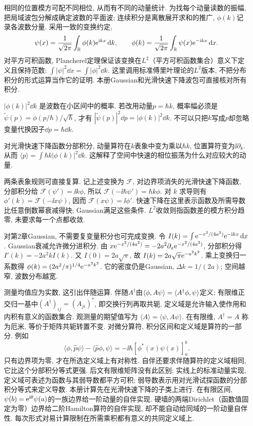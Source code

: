 相同的位置模方可配不同相位, 从而有不同的动量统计. 为找每个动量读数的振幅, 把局域波包分解成确定波数的平面波; 连续积分是离散展开求和的推广, $\phi(k)$记录各波数分量. 采用一致的变换约定,
\[
\psi(x)=\frac1{\sqrt{2\pi}}\int_\mathbb R\phi(k)\mathrm e^{\mathrm i kx}\,\mathrm d k,
\qquad
\phi(k)=\frac1{\sqrt{2\pi}}\int_\mathbb R\psi(x)\mathrm e^{-\mathrm i kx}\,\mathrm d x.
\]
对平方可积函数, Plancherel定理保证该变换在$L^2$（平方可积函数集合）意义下定义且保持范数: $\int|\psi|^2\dd x=\int|\phi|^2\dd k$. 这里调用标准傅里叶理论的$L^2$版本, 不把分布积分的形式运算当作它的证明. 本册Gaussian和光滑快速下降波包可直接核对所有积分.

$|\phi(k)|^2\dd k$ 是波数在小区间中的概率. 若改用动量$p=\hbar k$, 概率幅必须是 $\widetilde\psi(p)=\phi(p/\hbar)/\sqrt\hbar$, 才有 $|\widetilde\psi(p)|^2\dd p=|\phi(k)|^2\dd k$. 不可以只把$k$写成$p$却忽略变量代换因子$\dd p=\hbar\dd k$.

对光滑快速下降函数分部积分, 动量算符在$k$表象中变为乘以$\hbar k$, 位置算符变为$\ii\partial_k$. 从而 $\langle p\rangle=\int\hbar k|\phi(k)|^2\dd k$. 这解释了空间中快速的相位振荡为什么对应较大的动量.

两条表象规则可直接复算. 记上述变换为 $\mathcal F$, 对边界项消失的光滑快速下降函数, 分部积分给
$\mathcal F(\psi')=\ii k\phi$, 所以 $\mathcal F(-\ii\hbar\psi')=\hbar k\phi$. 对 $k$ 求导则有 $\phi'(k)=\mathcal F(-\ii x\psi)$, 因而 $\mathcal F(x\psi)=\ii\phi'$. 快速下降在这里表示函数及所需导数比任意倒数幂衰减得快; Gaussian满足这些条件. $L^2$收敛则指函数差的模方积分趋零, 未要求每一个点都收敛.

对第2章Gaussian, 不需要复变量积分也可完成变换. 令 $I(k)=\int\mathrm e^{-x^2/(4a^2)}\mathrm e^{-\mathrm i kx}\,\mathrm d x$. Gaussian衰减允许微分进积分. 由 $x\mathrm e^{-x^2/(4a^2)}=-2a^2\partial_x\mathrm e^{-x^2/(4a^2)}$, 分部积分得 $I'(k)=-2a^2kI(k)$. 又 $I(0)=2a\sqrt\pi$, 故 $I(k)=2a\sqrt\pi\mathrm e^{-a^2k^2}$. 乘上变换归一系数得
$\phi(k)=(2a^2/\pi)^{1/4}\mathrm e^{-a^2k^2}$. 它的密度仍是Gaussian, $\Delta k=1/(2a)$; 空间越窄, 波数分布越宽.


测量均值应为实数, 这引出伴随运算. 伴随$A^\dagger$由$\langle \phi,A\psi\rangle=\langle A^\dagger\phi,\psi\rangle$定义; 有限维正交归一基中$(A^\dagger)_{ij}=(A_{ji})^*$, 即交换行列再取共轭. 定义域是允许输入使作用和内积有意义的函数集合. 观测量的期望值写为 $\langle A\rangle=\langle\psi,A\psi\rangle$. 在有限维, $A^\dagger=A$ 称为厄米, 等价于矩阵共轭转置不变. 对微分算符, 积分区间和定义域是算符的一部分. 例如
\[
\langle\phi,\hat p\psi\rangle-\langle\hat p\phi,\psi\rangle
=-\ii\hbar[\phi^*(x)\psi(x)]_{a}^{b}.
\]
只有边界项为零, 才在所选定义域上有对称性. 自伴还要求伴随算符的定义域相同, 它比这个分部积分等式更强. 后文有限维矩阵没有此区别; 实线上的标准动量实现, 定义域可表述为函数与其弱导数都平方可积; 弱导数表示用对光滑试探函数的分部积分等式来定义导数. 本册计算先在光滑快速下降的子类上进行. 在有限区间, $\psi(b)=\mathrm e^{\mathrm i\theta}\psi(a)$的一族边界给一阶动量的自伴实现. 硬墙的两端Dirichlet（函数值固定为零）边界给二阶Hamilton算符的自伴实现, 却不能自动给同域的一阶动量自伴性. 每次形式对易计算限制在所需乘积都有意义的共同定义域上.


